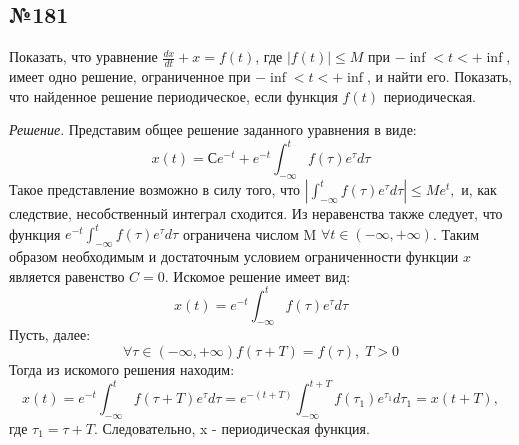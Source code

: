 \documentclass[11pt, a4paper]{article}
\begin{document}
	\subsection*{№181}
	\par
	Показать, что уравнение $\frac{dx}{dt}+x=f(t)$, где $|f(t)| \leq M$ при $-\inf < t < +\inf$, имеет одно решение, ограниченное при $-\inf < t < +\inf$, и найти его. Показать, что найденное решение периодическое, если функция $f(t)$ периодическая.
	\vspace{0.2cm}
	\par
	\textit{Решение}. Представим общее решение заданного уравнения в виде:
	$$x(t)=Сe^{-t}+e^{-t}\int_{-\infty}^t f(\tau)e^{\tau}d\tau$$
	Такое представление возможно в силу того, что $\left|\int_{-\infty}^t f(\tau)e^{\tau}d\tau \right| \leq Me^t,$ и, как следствие, несобственный интеграл сходится. 
	Из неравенства также следует, что функция $e^{-t}\int_{-\infty}^t f(\tau)e^{\tau}d\tau$ ограничена числом M $ \forall t \in (-\infty,+\infty)$. Таким образом необходимым и достаточным условием ограниченности функции $x$ является равенство $C=0$. Искомое решение имеет вид:
	$$x(t)=e^{-t}\int_{-\infty}^t f(\tau)e^{\tau}d\tau$$
	Пусть, далее:
	$$ \forall \tau \in (-\infty,+\infty)  f(\tau +T)=f(\tau),\; T>0$$
	Тогда из искомого решения находим:
	$$x(t) = e^{-t} \int^t_{-\infty} f(\tau + T)e^\tau d\tau = e^{-(t+T)} \int^{t+T}_{-\infty} f({\tau}_1)e^{{\tau}_1}d{\tau}_1 = x(t+T),$$
	где $\tau_1=\tau+T$. Следовательно, x - периодическая функция.
\end{document}
